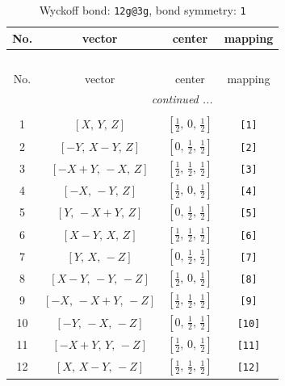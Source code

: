 \documentclass[fleqn,8pt]{jsarticle}
\begin{document}
\begin{longtable}{cccc}
\caption{Wyckoff bond: {\tt 12g@3g}, bond symmetry: {\tt 1}}
 \\
 \hline \hline
No. & vector & center & mapping \\ \hline \endfirsthead

\multicolumn{3}{l}{\tablename\ \thetable{}} \\
 \hline \hline
No. & vector & center & mapping \\ \hline \endhead

 \hline \hline
\multicolumn{3}{r}{\footnotesize\it continued ...} \\ \endfoot

 \hline \hline
\multicolumn{3}{r}{} \\ \endlastfoot

1 & $\left[ X,\, Y,\, Z \right]$ & $\left[ \frac{1}{2},\, 0,\, \frac{1}{2} \right]$ & {\tt [1]} \\ \hline
2 & $\left[ - Y,\, X - Y,\, Z \right]$ & $\left[ 0,\, \frac{1}{2},\, \frac{1}{2} \right]$ & {\tt [2]} \\ \hline
3 & $\left[ - X + Y,\, - X,\, Z \right]$ & $\left[ \frac{1}{2},\, \frac{1}{2},\, \frac{1}{2} \right]$ & {\tt [3]} \\ \hline
4 & $\left[ - X,\, - Y,\, Z \right]$ & $\left[ \frac{1}{2},\, 0,\, \frac{1}{2} \right]$ & {\tt [4]} \\ \hline
5 & $\left[ Y,\, - X + Y,\, Z \right]$ & $\left[ 0,\, \frac{1}{2},\, \frac{1}{2} \right]$ & {\tt [5]} \\ \hline
6 & $\left[ X - Y,\, X,\, Z \right]$ & $\left[ \frac{1}{2},\, \frac{1}{2},\, \frac{1}{2} \right]$ & {\tt [6]} \\ \hline
7 & $\left[ Y,\, X,\, - Z \right]$ & $\left[ 0,\, \frac{1}{2},\, \frac{1}{2} \right]$ & {\tt [7]} \\ \hline
8 & $\left[ X - Y,\, - Y,\, - Z \right]$ & $\left[ \frac{1}{2},\, 0,\, \frac{1}{2} \right]$ & {\tt [8]} \\ \hline
9 & $\left[ - X,\, - X + Y,\, - Z \right]$ & $\left[ \frac{1}{2},\, \frac{1}{2},\, \frac{1}{2} \right]$ & {\tt [9]} \\ \hline
10 & $\left[ - Y,\, - X,\, - Z \right]$ & $\left[ 0,\, \frac{1}{2},\, \frac{1}{2} \right]$ & {\tt [10]} \\ \hline
11 & $\left[ - X + Y,\, Y,\, - Z \right]$ & $\left[ \frac{1}{2},\, 0,\, \frac{1}{2} \right]$ & {\tt [11]} \\ \hline
12 & $\left[ X,\, X - Y,\, - Z \right]$ & $\left[ \frac{1}{2},\, \frac{1}{2},\, \frac{1}{2} \right]$ & {\tt [12]} \\
\end{longtable}
\end{document}
